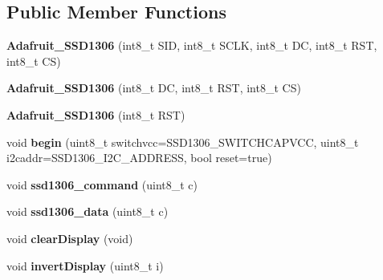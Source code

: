 \subsection*{Public Member Functions}
\begin{DoxyCompactItemize}
\item 
\hypertarget{class_adafruit___s_s_d1306_afa528a297f64684f6b81d2918fee76ea}{}{\bfseries Adafruit\+\_\+\+S\+S\+D1306} (int8\+\_\+t S\+I\+D, int8\+\_\+t S\+C\+L\+K, int8\+\_\+t D\+C, int8\+\_\+t R\+S\+T, int8\+\_\+t C\+S)\label{class_adafruit___s_s_d1306_afa528a297f64684f6b81d2918fee76ea}

\item 
\hypertarget{class_adafruit___s_s_d1306_aa7fcad43307cfed089bf7f4a7ce5ffbc}{}{\bfseries Adafruit\+\_\+\+S\+S\+D1306} (int8\+\_\+t D\+C, int8\+\_\+t R\+S\+T, int8\+\_\+t C\+S)\label{class_adafruit___s_s_d1306_aa7fcad43307cfed089bf7f4a7ce5ffbc}

\item 
\hypertarget{class_adafruit___s_s_d1306_aac7f93129e1d0f1a151f926ebc23643d}{}{\bfseries Adafruit\+\_\+\+S\+S\+D1306} (int8\+\_\+t R\+S\+T)\label{class_adafruit___s_s_d1306_aac7f93129e1d0f1a151f926ebc23643d}

\item 
\hypertarget{class_adafruit___s_s_d1306_a804a4689c2e09a5300f72251fd481a1b}{}void {\bfseries begin} (uint8\+\_\+t switchvcc=S\+S\+D1306\+\_\+\+S\+W\+I\+T\+C\+H\+C\+A\+P\+V\+C\+C, uint8\+\_\+t i2caddr=S\+S\+D1306\+\_\+\+I2\+C\+\_\+\+A\+D\+D\+R\+E\+S\+S, bool reset=true)\label{class_adafruit___s_s_d1306_a804a4689c2e09a5300f72251fd481a1b}

\item 
\hypertarget{class_adafruit___s_s_d1306_a99182555a08549492f6c40ceea0abc3d}{}void {\bfseries ssd1306\+\_\+command} (uint8\+\_\+t c)\label{class_adafruit___s_s_d1306_a99182555a08549492f6c40ceea0abc3d}

\item 
\hypertarget{class_adafruit___s_s_d1306_a694dc2e0d8e07ac144742119a4f55cfe}{}void {\bfseries ssd1306\+\_\+data} (uint8\+\_\+t c)\label{class_adafruit___s_s_d1306_a694dc2e0d8e07ac144742119a4f55cfe}

\item 
\hypertarget{class_adafruit___s_s_d1306_afe1e0f5efabd931aab7998275356744d}{}void {\bfseries clear\+Display} (void)\label{class_adafruit___s_s_d1306_afe1e0f5efabd931aab7998275356744d}

\item 
\hypertarget{class_adafruit___s_s_d1306_aff04df12e2ec8b6a57a9b9856b507cf4}{}void {\bfseries invert\+Display} (uint8\+\_\+t i)\label{class_adafruit___s_s_d1306_aff04df12e2ec8b6a57a9b9856b507cf4}


\end{DoxyCompactItemize}
